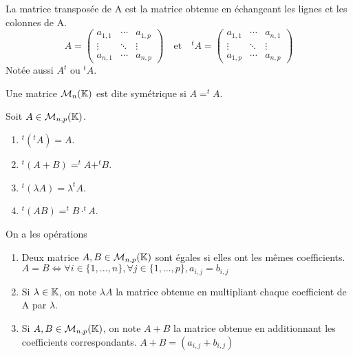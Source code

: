 \documentclass[a4paper, 12pt]{article}
\begin{document}
\begin{definition}
    La matrice transposée de A est la matrice obtenue en échangeant les lignes et les colonnes de A.
    $$
        A = \begin{pmatrix}
            a_{1, 1} & \cdots & a_{1, p} \\
            \vdots & \ddots & \vdots \\
            a_{n, 1} & \cdots & a_{n, p}
        \end{pmatrix}
        \quad \text{et} \quad
        ^tA = \begin{pmatrix}
            a_{1, 1} & \cdots & a_{n, 1} \\
            \vdots & \ddots & \vdots \\
            a_{1, p} & \cdots & a_{n, p}
        \end{pmatrix}
    $$
    Notée aussi $A^t$ ou $^tA$.
\end{definition}

\begin{definition}
    Une matrice $\mathcal{M}_{n}(\mathbb{K})$ est dite symétrique si $A = ^tA$.
\end{definition}

\begin{remark}
    Soit $A \in \mathcal{M}_{n, p}(\mathbb{K})$.
    \begin{enumerate}
        \item $^t(^tA) = A$.
        \item $^t(A + B) = ^tA + ^tB$.
        \item $^t(\lambda A) = \lambda ^tA$.
        \item $^t(AB) = ^tB \cdot ^tA$.
    \end{enumerate}
\end{remark}

\begin{definition} On a les opérations
    \begin{enumerate}
        \item 
        Deux matrice $A, B \in \mathcal{M}_{n, p}(\mathbb{K})$ sont égales si elles ont les mêmes coefficients.
        $A = B \iff \forall i \in \{1, ..., n\}, \forall j \in \{1, ..., p\}, a_{i, j} = b_{i, j}$
        \item Si $\lambda \in \mathbb{K}$, on note $\lambda A$ la matrice obtenue en multipliant chaque coefficient de A par $\lambda$.
        \item Si $A, B \in \mathcal{M}_{n, p}(\mathbb{K})$, on note $A + B$ la matrice obtenue en additionnant les coefficients correspondants.
        $A + B = (a_{i, j} + b_{i, j})$
    \end{enumerate}
\end{definition}
\end{document}
